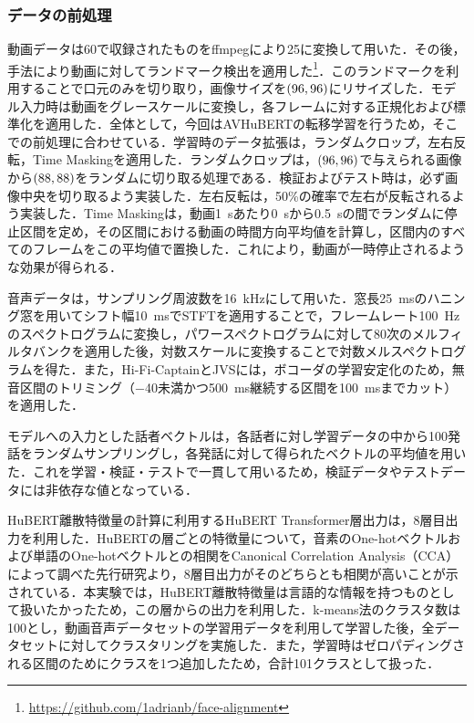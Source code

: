 \subsubsection{データの前処理}
動画データは\SI{60}{\fps}で収録されたものをffmpegにより\SI{25}{\fps}に変換して用いた．その後，手法\cite{bulat2017far}により動画に対してランドマーク検出を適用した\footnote{\url{https://github.com/1adrianb/face-alignment}}．このランドマークを利用することで口元のみを切り取り，画像サイズを$\left(96, 96\right)$にリサイズした．モデル入力時は動画をグレースケールに変換し，各フレームに対する正規化および標準化を適用した．全体として，今回はAVHuBERTの転移学習を行うため，そこでの前処理に合わせている．学習時のデータ拡張は，ランダムクロップ，左右反転，Time Maskingを適用した．ランダムクロップは，$\left(96, 96\right)$で与えられる画像から$\left(88, 88\right)$をランダムに切り取る処理である．検証およびテスト時は，必ず画像中央を切り取るよう実装した．左右反転は，50\%の確率で左右が反転されるよう実装した．Time Maskingは，動画\SI{1}{\s}あたり\SI{0}{\s}から\SI{0.5}{\s}の間でランダムに停止区間を定め，その区間における動画の時間方向平均値を計算し，区間内のすべてのフレームをこの平均値で置換した．これにより，動画が一時停止されるような効果が得られる．

音声データは，サンプリング周波数を\SI{16}{\kHz}にして用いた．窓長\SI{25}{\ms}のハニング窓を用いてシフト幅\SI{10}{\ms}でSTFTを適用することで，フレームレート\SI{100}{\Hz}のスペクトログラムに変換し，パワースペクトログラムに対して80次のメルフィルタバンクを適用した後，対数スケールに変換することで対数メルスペクトログラムを得た．また，Hi-Fi-CaptainとJVSには，ボコーダの学習安定化のため，無音区間のトリミング（\SI{-40}{\dBFS}未満かつ\SI{500}{\ms}継続する区間を\SI{100}{\ms}までカット）を適用した．

モデルへの入力とした話者ベクトルは，各話者に対し学習データの中から100発話をランダムサンプリングし，各発話に対して得られたベクトルの平均値を用いた．これを学習・検証・テストで一貫して用いるため，検証データやテストデータには非依存な値となっている．

HuBERT離散特徴量の計算に利用するHuBERT Transformer層出力は，8層目出力を利用した．HuBERTの層ごとの特徴量について，音素のOne-hotベクトルおよび単語のOne-hotベクトルとの相関をCanonical Correlation Analysis（CCA）によって調べた先行研究\cite{pasad2023comparative}より，8層目出力がそのどちらとも相関が高いことが示されている．本実験では，HuBERT離散特徴量は言語的な情報を持つものとして扱いたかったため，この層からの出力を利用した．k-means法のクラスタ数は100とし，動画音声データセットの学習用データを利用して学習した後，全データセットに対してクラスタリングを実施した．また，学習時はゼロパディングされる区間のためにクラスを1つ追加したため，合計101クラスとして扱った．

